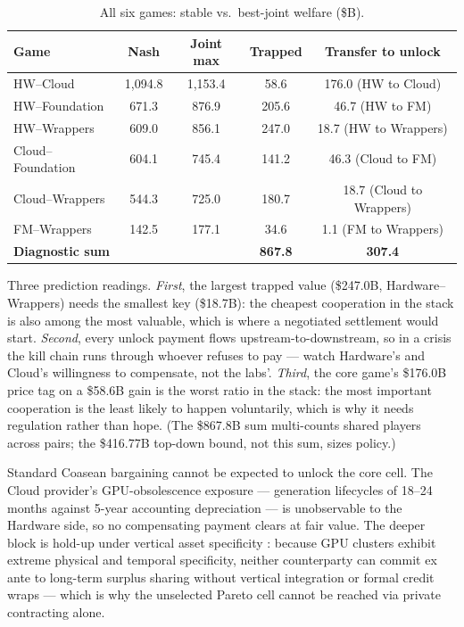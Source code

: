 \documentclass[11pt,a4paper]{article}
\begin{document}
\begin{table}[htbp]
\centering
\caption{All six games: stable vs.\ best-joint welfare (\$B).}
    \label{tab:02-all-six-games-stable}
\begin{tabular}{lcccc}
\toprule
Game & Nash & Joint max & Trapped & Transfer to unlock \\
\midrule
HW--Cloud & 1,094.8 & 1,153.4 & 58.6 & 176.0 (HW to Cloud) \\
HW--Foundation & 671.3 & 876.9 & 205.6 & 46.7 (HW to FM) \\
HW--Wrappers & 609.0 & 856.1 & 247.0 & 18.7 (HW to Wrappers) \\
Cloud--Foundation & 604.1 & 745.4 & 141.2 & 46.3 (Cloud to FM) \\
Cloud--Wrappers & 544.3 & 725.0 & 180.7 & 18.7 (Cloud to Wrappers) \\
FM--Wrappers & 142.5 & 177.1 & 34.6 & 1.1 (FM to Wrappers) \\
\midrule
\textbf{Diagnostic sum} & & & \textbf{867.8} & \textbf{307.4} \\
\bottomrule
\end{tabular}
\end{table}

Three prediction readings. \emph{First}, the largest trapped value
(\$247.0B, Hardware--Wrappers) needs the smallest key (\$18.7B): the
cheapest cooperation in the stack is also among the most valuable, which is
where a negotiated settlement would start. \emph{Second}, every unlock
payment flows upstream-to-downstream, so in a crisis the kill chain runs
through whoever refuses to pay --- watch Hardware's and Cloud's willingness
to compensate, not the labs'. \emph{Third}, the core game's \$176.0B price
tag on a \$58.6B gain is the worst ratio in the stack: the most important
cooperation is the least likely to happen voluntarily, which is why it needs
regulation rather than hope. (The \$867.8B sum multi-counts shared players
across pairs; the \$416.77B top-down bound, not this sum, sizes policy.)

Standard Coasean bargaining cannot be expected to unlock the core cell.
The Cloud provider's GPU-obsolescence exposure --- generation lifecycles of
18--24 months against 5-year accounting depreciation --- is unobservable to
the Hardware side, so no compensating payment clears at fair value. The
deeper block is hold-up under vertical asset specificity
\citep{klein1978,williamson1985}: because GPU clusters exhibit extreme
physical and temporal specificity, neither counterparty can commit ex ante
to long-term surplus sharing without vertical integration or formal credit
wraps --- which is why the unselected Pareto cell cannot be reached via
private contracting alone.
\end{document}
